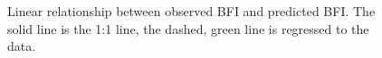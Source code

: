 \documentclass[
  authoryear,
  preprint,
  1p,
  onecolumn]{elsarticle}
\begin{document}
\begin{figure}


\caption{\label{fig-actual_predicted}Linear relationship between
observed BFI and predicted BFI. The solid line is the 1:1 line, the
dashed, green line is regressed to the data.}

\end{figure}%
\end{document}
